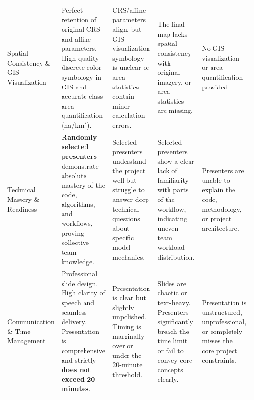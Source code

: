 \documentclass[10pt]{article}
\begin{document}
\begin{table}[h!]
\begin{tabularx}{\textwidth}{>{\selectfont}p{2.2cm} L L L L}
Spatial Consistency \& GIS Visualization &
Perfect retention of original CRS and affine parameters. High-quality discrete color symbology in GIS and accurate class area quantification (ha/km$^2$). &
CRS/affine parameters align, but GIS visualization symbology is unclear or area statistics contain minor calculation errors. &
The final map lacks spatial consistency with original imagery, or area statistics are missing. &
No GIS visualization or area quantification provided. \\

Technical Mastery \& Readiness &
\textbf{Randomly selected presenters} demonstrate absolute mastery of the code, algorithms, and workflows, proving collective team knowledge. &
Selected presenters understand the project well but struggle to answer deep technical questions about specific model mechanics. &
Selected presenters show a clear lack of familiarity with parts of the workflow, indicating uneven team workload distribution. &
Presenters are unable to explain the code, methodology, or project architecture. \\

Communication \& Time Management &
Professional slide design. High clarity of speech and seamless delivery. Presentation is comprehensive and strictly \textbf{does not exceed 20 minutes}. &
Presentation is clear but slightly unpolished. Timing is marginally over or under the 20-minute threshold. &
Slides are chaotic or text-heavy. Presenters significantly breach the time limit or fail to convey core concepts clearly. &
Presentation is unstructured, unprofessional, or completely misses the core project constraints. \\

\bottomrule
\end{tabularx}
\end{table}
\end{document}

